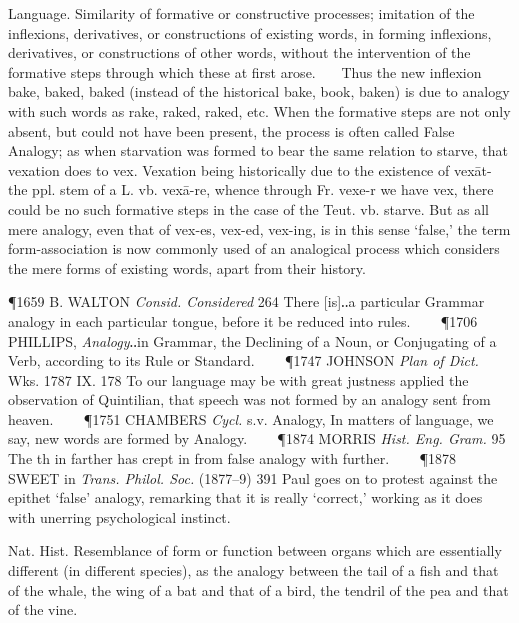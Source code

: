 \begin{description}[wide, labelwidth=!, labelindent=0pt]
\begin{myenumerate}
 Language. Similarity of formative or constructive processes; imitation of the inflexions, derivatives, or constructions of existing words, in forming inflexions, derivatives, or constructions of other words, without the intervention of the formative steps through which these at first arose.
   Thus the new inflexion bake, baked, baked (instead of the historical bake, book, baken) is due to analogy with such words as rake, raked, raked, etc. When the formative steps are not only absent, but could not have been present, the process is often called False Analogy; as when starvation was formed to bear the same relation to starve, that vexation does to vex. Vexation being historically due to the existence of vexāt- the ppl. stem of a L. vb. vexā-re, whence through Fr. vexe-r we have vex, there could be no such formative steps in the case of the Teut. vb. starve. But as all mere analogy, even that of vex-es, vex-ed, vex-ing, is in this sense ‘false,’ the term form-association is now commonly used of an analogical process which considers the mere forms of existing words, apart from their history. 

\P 1659 B. WALTON \textit{Consid. Considered} 264 There [is]‥a particular Grammar analogy in each particular tongue, before it be reduced into rules.    
\P 1706 PHILLIPS, \textit{Analogy}‥in Grammar, the Declining of a Noun, or Conjugating of a Verb, according to its Rule or Standard.    
\P 1747 JOHNSON \textit{Plan of Dict.} Wks. 1787 IX. 178 To our language may be with great justness applied the observation of Quintilian, that speech was not formed by an analogy sent from heaven.    
\P 1751 CHAMBERS \textit{Cycl.} s.v. Analogy, In matters of language, we say, new words are formed by Analogy.    
\P 1874 MORRIS \textit{Hist. Eng. Gram.} 95 The th in farther has crept in from false analogy with further.    
\P 1878 SWEET in \textit{Trans. Philol. Soc.} (1877–9) 391 Paul goes on to protest against the epithet ‘false’ analogy, remarking that it is really ‘correct,’ working as it does with unerring psychological instinct.

 Nat. Hist. Resemblance of form or function between organs which are essentially different (in different species), as the analogy between the tail of a fish and that of the whale, the wing of a bat and that of a bird, the tendril of the pea and that of the vine. 


\end{myenumerate}
\end{description}
